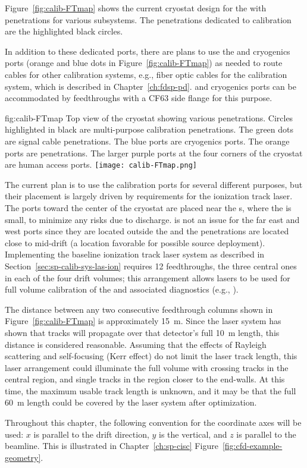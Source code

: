 
Figure~\ref{fig:calib-FTmap} shows the current cryostat design for the %
 with penetrations for various subsystems. The penetrations dedicated to calibration are the highlighted black circles. 

In addition to these dedicated ports, there are plans to use the  and cryogenics ports (orange and blue dots in Figure~\ref{fig:calib-FTmap}) as needed to route cables for other calibration systems, e.g., fiber optic cables for the  calibration system, which is described in Chapter~\ref{ch:fdsp-pd}.  and cryogenics ports can be accommodated by feedthroughs with a CF63 side flange for this purpose.   

\begin{dunefigure}{fig:calib-FTmap}
{Top view of the \spmod %
cryostat showing various penetrations. Circles highlighted in black are multi-purpose calibration penetrations. The green dots are  signal cable penetrations. The blue ports are cryogenics ports. The orange ports are  penetrations. The larger purple ports at the four corners of the cryostat are human access ports.}
\texttt{[image: calib-FTmap.png]}
\end{dunefigure}

The current plan is to use the calibration ports for several different purposes, but their placement is largely driven by requirements for the ionization track laser. %
The ports %
toward the center of the cryostat are placed near the s, where the \efield is small, %
to minimize any risks due to %
 discharge.  is not an issue for the far east and west ports since they are located outside the  and the penetrations are located %
close to mid-drift (a location favorable for possible source deployment).
Implementing the baseline ionization track laser system as %
described in Section~\ref{sec:sp-calib-sys-las-ion} requires \num{12} feedthroughs, the three central ones in each of the four  drift volumes; this arrangement allows lasers to be used for full volume calibration of the \efield and associated diagnostics (e.g., ). 

The distance between any two consecutive feedthrough columns shown in Figure~\ref{fig:calib-FTmap} is approximately \SI{15}{\m}. Since the  laser system has shown that tracks will propagate over that detector's full \SI{10}{\m} length, this distance is considered reasonable. Assuming that the effects of Rayleigh scattering and self-focusing (Kerr effect) do not limit the laser track length, this laser arrangement could illuminate the full volume with crossing tracks in the central region, and single tracks %
in the region closer to the end-walls.  %
At this time, the maximum usable track length is unknown, and it may be that the full \SI{60}{\m} \detmodule length could be covered by the laser system after optimization.

Throughout this chapter, the following convention for the coordinate axes will be used: $x$ is parallel to the drift direction, $y$ is the vertical, and $z$ is parallel to the beamline. This is illustrated in Chapter~\ref{ch:sp-cisc} Figure~\ref{fig:cfd-example-geometry}.
